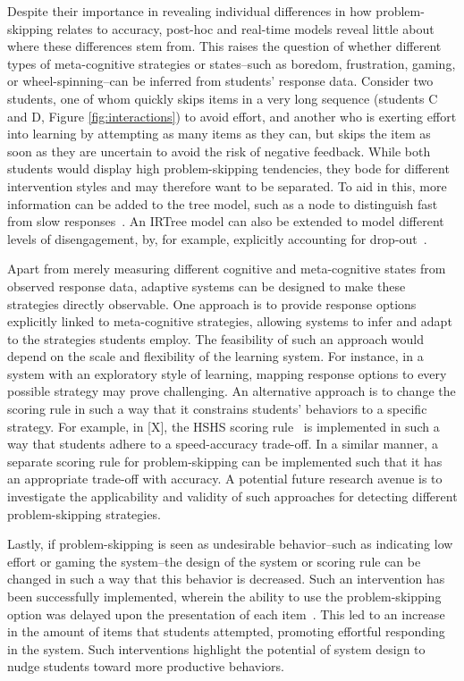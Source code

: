 \documentclass[12pt]{article}
\begin{document}
Despite their importance in revealing individual differences in how problem-skipping relates to accuracy, post-hoc and real-time models reveal little about where these differences stem from. This raises the question of whether different types of meta-cognitive strategies or states--such as boredom, frustration, gaming, or wheel-spinning--can be inferred from students' response data. Consider two students, one of whom quickly skips items in a very long sequence (students C and D, Figure \ref{fig:interactions}) to avoid effort, and another who is exerting effort into learning by attempting as many items as they can, but skips the item as soon as they are uncertain to avoid the risk of negative feedback. While both students would display high problem-skipping tendencies, they bode for different intervention styles and may therefore want to be separated. To aid in this, more information can be added to the tree model, such as a node to distinguish fast from slow responses~\parencite{coomans2016distinguishing, hofman2018fast}. An IRTree model can also be extended to model different levels of disengagement, by, for example, explicitly accounting for drop-out~\parencite{huang2020mixture}. 

Apart from merely measuring different cognitive and meta-cognitive states from observed response data, adaptive systems can be designed to make these strategies directly observable. One approach is to provide response options explicitly linked to meta-cognitive strategies, allowing systems to infer and adapt to the strategies students employ. The feasibility of such an approach would depend on the scale and flexibility of the learning system. For instance, in a system with an exploratory style of learning, mapping response options to every possible strategy may prove challenging. An alternative approach is to change the scoring rule in such a way that it constrains students' behaviors to a specific strategy. For example, in [X], the HSHS scoring rule~\parencite{maris2012speed} is implemented in such a way that students adhere to a speed-accuracy trade-off. In a similar manner, a separate scoring rule for problem-skipping can be implemented such that it has an appropriate trade-off with accuracy. A potential future research avenue is to investigate the applicability and validity of such approaches for detecting different problem-skipping strategies. 

Lastly, if problem-skipping is seen as undesirable behavior--such as indicating low effort or gaming the system--the design of the system or scoring rule can be changed in such a way that this behavior is decreased. Such an intervention has been successfully implemented, wherein the ability to use the problem-skipping option was delayed upon the presentation of each item~\parencite{savi2018delaying}. This led to an increase in the amount of items that students attempted, promoting effortful responding in the system. Such interventions highlight the potential of system design to nudge students toward more productive behaviors.
\end{document}
